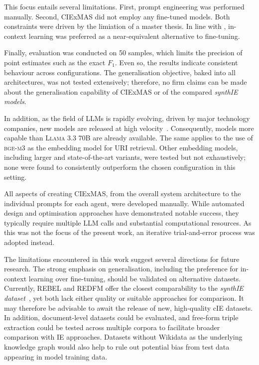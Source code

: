 \documentclass[a4paper,oneside,bibliography=totoc]{scrbook}
\begin{document}
This focus entails several limitations. First, prompt engineering was performed manually. Second, CIExMAS did not employ any fine-tuned models. Both constraints were driven by the limiation of a master thesis. In line with \citet{Brown2020}, in-context learning was preferred as a near-equivalent alternative to fine-tuning.

Finally, evaluation was conducted on 50 samples, which limits the precision of point estimates such as the exact $F_{1}$. Even so, the results indicate consistent behaviour across configurations. The generalisation objective, baked into all architectures, was not tested extensively; therefore, no firm claims can be made about the generalisation capability of CIExMAS or of the compared \textit{synthIE models}.

In addition, as the field of \acp{LLM} is rapidly evolving, driven by major technology companies, new models are released at high velocity~\cite{Brown2020,Grattafiori2024,MetaAI2025,Chiang2024}. Consequently, models more capable than \textsc{Llama 3.3 70B} are already available. The same applies to the use of \textsc{bge-m3} as the embedding model for \ac{URI} retrieval. Other embedding models, including larger and state-of-the-art variants, were tested but not exhaustively; none were found to consistently outperform the chosen configuration in this setting.

All aspects of creating CIExMAS, from the overall system architecture to the individual prompts for each agent, were developed manually. While automated design and optimisation approaches have demonstrated notable success, they typically require multiple \ac{LLM} calls and substantial computational resources. As this was not the focus of the present work, an iterative trial-and-error process was adopted instead.

The limitations encountered in this work suggest several directions for future research. The strong emphasis on generalisation, including the preference for in-context learning over fine-tuning, should be validated on alternative datasets. Currently, REBEL and REDFM offer the closest comparability to the \textit{synthIE dataset}~\cite{HuguetCabot2021,Cabot2023}, yet both lack either quality or suitable approaches for comparison. It may therefore be advisable to await the release of new, high-quality \ac{cIE} datasets. In addition, document-level datasets could be evaluated, and free-form triple extraction could be tested across multiple corpora to facilitate broader comparison with \ac{IE} approaches. Datasets without Wikidata as the underlying knowledge graph would also help to rule out potential bias from test data appearing in model training data.
\end{document}
